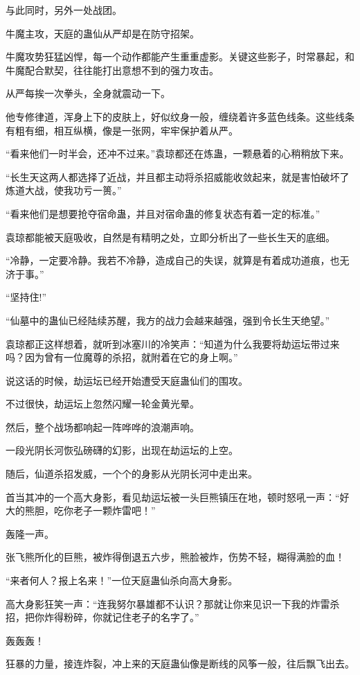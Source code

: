 \begin{this_body}
与此同时，另外一处战团。

牛魔主攻，天庭的蛊仙从严却是在防守招架。

牛魔攻势狂猛凶悍，每一个动作都能产生重重虚影。关键这些影子，时常暴起，和牛魔配合默契，往往能打出意想不到的强力攻击。

从严每挨一次拳头，全身就震动一下。

他专修律道，浑身上下的皮肤上，好似纹身一般，缠绕着许多蓝色线条。这些线条有粗有细，相互纵横，像是一张网，牢牢保护着从严。

“看来他们一时半会，还冲不过来。”袁琼都还在炼蛊，一颗悬着的心稍稍放下来。

“长生天这两人都选择了近战，并且都主动将杀招威能收敛起来，就是害怕破坏了炼道大战，使我功亏一篑。”

“看来他们是想要抢夺宿命蛊，并且对宿命蛊的修复状态有着一定的标准。”

袁琼都能被天庭吸收，自然是有精明之处，立即分析出了一些长生天的底细。

“冷静，一定要冷静。我若不冷静，造成自己的失误，就算是有着成功道痕，也无济于事。”

“坚持住!”

“仙墓中的蛊仙已经陆续苏醒，我方的战力会越来越强，强到令长生天绝望。”

袁琼都正这样想着，就听到冰塞川的冷笑声：“知道为什么我要将劫运坛带过来吗？因为曾有一位魔尊的杀招，就附着在它的身上啊。”

说这话的时候，劫运坛已经开始遭受天庭蛊仙们的围攻。

不过很快，劫运坛上忽然闪耀一轮金黄光晕。

然后，整个战场都响起一阵哗哗的浪潮声响。

一段光阴长河恢弘磅礴的幻影，出现在劫运坛的上空。

随后，仙道杀招发威，一个个的身影从光阴长河中走出来。

首当其冲的一个高大身影，看见劫运坛被一头巨熊镇压在地，顿时怒吼一声：“好大的熊胆，吃你老子一颗炸雷吧！”

轰隆一声。

张飞熊所化的巨熊，被炸得倒退五六步，熊脸被炸，伤势不轻，糊得满脸的血！

“来者何人？报上名来！”一位天庭蛊仙杀向高大身影。

高大身影狂笑一声：“连我努尔暴雄都不认识？那就让你来见识一下我的炸雷杀招，把你炸得粉碎，你就记住老子的名字了。”

轰轰轰！

狂暴的力量，接连炸裂，冲上来的天庭蛊仙像是断线的风筝一般，往后飘飞出去。


\end{this_body}

